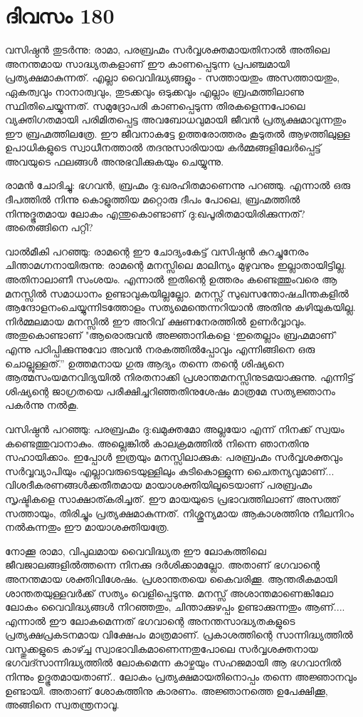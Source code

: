 \section{ദിവസം 180}


വസിഷ്ഠൻ തുടർന്നു: രാമാ, പരബ്രഹ്മം സർവ്വശക്തമായതിനാൽ അതിലെ അനന്തമായ സാദ്ധ്യതകളാണ്‌ ഈ കാണപ്പെടുന്ന പ്രപഞ്ചമായി പ്രത്യക്ഷമാകുന്നത്. എല്ലാ വൈവിദ്ധ്യങ്ങളും - സത്തായതും അസത്തായതും, ഏകത്വവും നാനാത്വവും, തുടക്കവും ഒടുക്കവും എല്ലാം ബ്രഹ്മത്തിലാണു സ്ഥിതിചെയ്യുന്നത്. സമുദ്രോപരി കാണപ്പെടുന്ന തിരകളെന്നപോലെ വ്യക്തിഗതമായി പരിമിതപ്പെട്ട അവബോധവുമായി ജീവൻ പ്രത്യക്ഷമാവുന്നതും ഈ ബ്രഹ്മത്തിലത്രേ. ഈ ജീവനാകട്ടേ ഉത്തരോത്തരം കൂടുതൽ ആഴത്തിലുള്ള ഉപാധികളുടെ സ്വാധീനത്താൽ തദനുസാരിയായ കർമ്മങ്ങളിലേർപ്പെട്ട് അവയുടെ ഫലങ്ങൾ അനുഭവിക്കുകയും ചെയ്യുന്നു.

രാമൻ ചോദിച്ചു: ഭഗവൻ, ബ്രഹ്മം ദു:ഖരഹിതമാണെന്നു പറഞ്ഞു. എന്നാൽ ഒരു ദീപത്തിൽ നിന്നു കൊളുത്തിയ മറ്റൊരു ദീപം പോലെ, ബ്രഹ്മത്തിൽ നിന്നുദ്ഭൂതമായ ലോകം എന്തുകൊണ്ടാണ്‌ ദു:ഖപൂരിതമായിരിക്കുന്നത്? അതെങ്ങിനെ പറ്റി?

വാൽമീകി പറഞ്ഞു: രാമന്റെ ഈ ചോദ്യംകേട്ട് വസിഷ്ഠൻ കുറച്ചുനേരം ചിന്താമഗ്നനായിരുന്നു: രാമന്റെ മനസ്സിലെ മാലിന്യം മുഴുവനും ഇല്ലാതായിട്ടില്ല. അതിനാലാണീ സംശയം. എന്നാൽ ഇതിന്റെ ഉത്തരം കണ്ടെത്തുംവരെ ആ മനസ്സിൽ സമാധാനം ഉണ്ടാവുകയില്ലല്ലോ. മനസ്സ് സുഖസന്തോഷചിന്തകളിൽ ആന്ദോളനംചെയ്യുന്നിടത്തോളം സത്യമെന്തെന്നറിയാൻ അതിനു കഴിയുകയില്ല. നിർമ്മലമായ മനസ്സിൽ ഈ അറിവ് ക്ഷണനേരത്തിൽ ഉണർവ്വാവും. അതുകൊണ്ടാണ്‌ "ആരൊരുവൻ അജ്ഞാനികളെ ‘ഇതെല്ലാം ബ്രഹ്മമാണ്‌’ എന്നു പഠിപ്പിക്കുന്നുവോ അവൻ നരകത്തിൽപ്പോവും എന്നിങ്ങിനെ ഒരു ചൊല്ലുള്ളത്.” ഉത്തമനായ ഗുരു ആദ്യം തന്നെ തന്റെ ശിഷ്യനെ ആത്മസംയമനവിദ്യയില്‍ നിരതനാക്കി പ്രശാന്തമനസ്സിനുടമയാക്കുന്നു. എന്നിട്ട് ശിഷ്യന്റെ ജാഗ്രതയെ പരീക്ഷിച്ചറിഞ്ഞതിനുശേഷം മാത്രമേ സത്യജ്ഞാനം പകർന്നു നൽകൂ.

വസിഷ്ഠൻ പറഞ്ഞു: പരബ്രഹ്മം ദു:ഖമുക്തമോ അല്ലയോ എന്ന് നിനക്ക് സ്വയം കണ്ടെത്തുവാനാകും. അല്ലെങ്കിൽ കാലക്രമത്തിൽ നിന്നെ ഞാനതിനു സഹായിക്കാം. ഇപ്പോള്‍  ഇത്രയും മനസ്സിലാക്കുക: പരബ്രഹ്മം സർവ്വശക്തവും സർവ്വവ്യാപിയും എല്ലാവരുടെയുള്ളിലും കുടികൊള്ളുന്ന ചൈതന്യവുമാണ്‌... വിശദീകരണങ്ങൾക്കതീതമായ മായാശക്തിയിലൂടെയാണ്‌ പരബ്രഹ്മം സൃഷ്ടികളെ സാക്ഷാത്കരിച്ചത്. ഈ മായയുടെ പ്രഭാവത്തിലാണ്‌ അസത്ത് സത്തായും, തിരിച്ചും പ്രത്യക്ഷമാകുന്നത്. നിശ്ശൂന്യമായ ആകാശത്തിനു നീലനിറം നൽകുന്നതും ഈ മായാശക്തിയത്രേ.

നോക്കൂ രാമാ, വിപുലമായ വൈവിദ്ധ്യത ഈ ലോകത്തിലെ ജീവജാലങ്ങളിൽത്തന്നെ നിനക്കു ദർശിക്കാമല്ലോ. അതാണ്‌ ഭഗവാന്റെ അനന്തമായ ശക്തിവിശേഷം. പ്രശാന്തതയെ കൈവരിക്കൂ. ആന്തരീകമായി ശാന്തതയുള്ളവർക്ക് സത്യം വെളിപ്പെടുന്നു. മനസ്സ് അശാന്തമാണെങ്കിലോ ലോകം വൈവിദ്ധ്യങ്ങൾ നിറഞ്ഞതും, ചിന്താക്കുഴപ്പം ഉണ്ടാക്കുന്നതും ആണ്‌.... എന്നാൽ ഈ ലോകമെന്നത് ഭഗവാന്റെ അനന്തസാദ്ധ്യതകളുടെ പ്രത്യക്ഷപ്രകടനമായ വിക്ഷേപം മാത്രമാണ്. പ്രകാശത്തിന്റെ സാന്നിദ്ധ്യത്തിൽ വസ്തുക്കളുടെ കാഴ്ച്ച സ്വാഭാവികമാണെന്നതുപോലെ സർവ്വശക്തനായ ഭഗവദ്സാന്നിദ്ധ്യത്തിൽ ലോകമെന്ന കാഴ്ചയും സഹജമായി ആ ഭഗവാനിൽ നിന്നും ഉദ്ഭൂതമായതാണ്‌.. ലോകം പ്രത്യക്ഷമായതിനൊപ്പം തന്നെ അജ്ഞാനവും ഉണ്ടായി. അതാണ്‌ ശോകത്തിനു കാരണം. അജ്ഞാനത്തെ ഉപേക്ഷിക്കൂ, അങ്ങിനെ സ്വതന്ത്രനാവൂ. 

